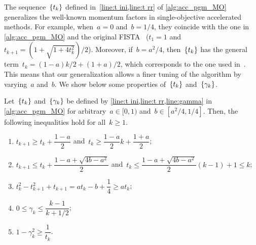 \documentclass[../main]{subfiles}
\begin{document}
The sequence~$\set{t_k}$ defined in~\cref{line:t ini,line:t rr} of \cref{alg:acc_pgm_MO} generalizes the well-known momentum factors in single-objective accelerated methods.
For example, when~$a = 0$ and~$b = 1 / 4$, they coincide with the one in \cref{alg:acc_pgm_MO} and the original FISTA~\cite{Nesterov1983,Beck2009} ($t_1 = 1$ and~$t_{k + 1} = (1 + \sqrt{1 + 4 t_k^2}) / 2$).
Moreover, if~$b = a^2 / 4$, then~$\set{t_k}$ has the general term~$t_k = (1 - a) k / 2 + (1 + a) / 2$, which corresponds to the one used in~\cite{Chambolle2015,Su2016,Attouch2016,Attouch2018}.
This means that our generalization allows a finer tuning of the algorithm by varying~$a$ and~$b$.
We show below some properties of~$\set*{t_k}$ and~$\set*{\gamma_k}$.
\begin{lemma} \label{thm:t}
    Let~$\set{t_k}$ and~$\set*{\gamma_k}$ be defined by \cref{line:t ini,line:t rr,line:gamma} in \cref{alg:acc_pgm_MO} for arbitrary~$a \in [0, 1)$ and~$b \in [a^2 / 4, 1 / 4]$.
    Then, the following inequalities hold for all~$k \ge 1$.
    \begin{enumerate}
        \item $t_{k + 1} \ge t_k + \dfrac{1 - a}{2}$ and~$t_k \ge \dfrac{1 - a}{2} k + \dfrac{1 + a}{2}$; \label{thm:t:t geq}
        \item $t_{k + 1} \le t_k + \dfrac{1 - a + \sqrt{4b - a^2}}{2}$ and~$t_k \le \dfrac{1 - a + \sqrt{4b - a^2}}{2} (k - 1) + 1 \le k$; \label{thm:t:t leq}
        \item $t_k^2 - t_{k + 1}^2 + t_{k + 1} = a t_k - b + \dfrac{1}{4} \ge a t_k$; \label{thm:t:t over-relax geq}
        \item $0 \le \gamma_k \le \dfrac{k - 1}{k + 1 / 2}$; \label{thm:t:gamma}
        \item $1 - \gamma_k^2 \ge \dfrac{1}{t_k}$. \label{thm:t:t moment}
    \end{enumerate}
\end{lemma}
\end{document}
